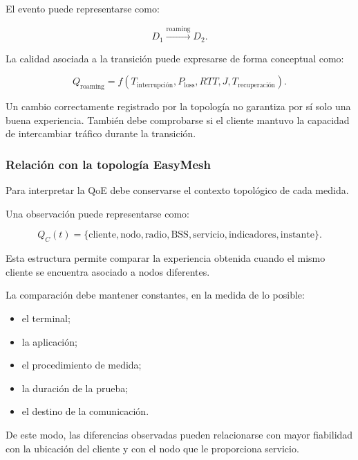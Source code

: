 El evento puede representarse como:

\[
    D_1
    \xrightarrow{\text{roaming}}
    D_2.
\]

La calidad asociada a la transición puede expresarse de forma conceptual
como:

\[
    Q_{\mathrm{roaming}}
    =
    f
    \left(
        T_{\mathrm{interrupción}},
        P_{\mathrm{loss}},
        RTT,
        J,
        T_{\mathrm{recuperación}}
    \right).
\]

Un cambio correctamente registrado por la topología no garantiza por sí
solo una buena experiencia. También debe comprobarse si el cliente
mantuvo la capacidad de intercambiar tráfico durante la transición.


\subsubsection*{Relación con la topología EasyMesh}

Para interpretar la QoE debe conservarse el contexto topológico de cada
medida.

Una observación puede representarse como:

\[
    Q_C(t)
    =
    \{
        \text{cliente},
        \text{nodo},
        \text{radio},
        \text{BSS},
        \text{servicio},
        \text{indicadores},
        \text{instante}
    \}.
\]

Esta estructura permite comparar la experiencia obtenida cuando el mismo
cliente se encuentra asociado a nodos diferentes.

La comparación debe mantener constantes, en la medida de lo posible:

\begin{itemize}
    \item el terminal;

    \item la aplicación;

    \item el procedimiento de medida;

    \item la duración de la prueba;

    \item el destino de la comunicación.
\end{itemize}

De este modo, las diferencias observadas pueden relacionarse con mayor
fiabilidad con la ubicación del cliente y con el nodo que le proporciona
servicio.


